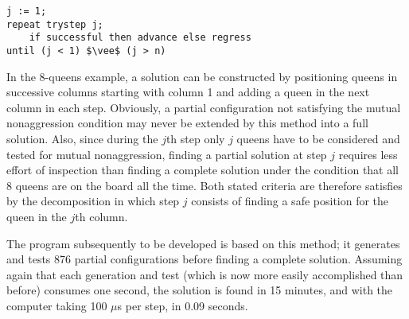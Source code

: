 \begin{lstlisting}
j := 1;
repeat trystep j;
    if successful then advance else regress
until (j < 1) $\vee$ (j > n)
\end{lstlisting}

In the 8-queens example, a solution can be constructed by positioning queens in
successive columns starting with column 1 and adding a queen in the next column
in each step.  Obviously, a partial configuration not satisfying the mutual
nonaggression condition may never be extended by this method into a full
solution.  Also, since during the $j$th step only $j$ queens have to be
considered and tested for mutual nonaggression, finding a partial solution at
step $j$ requires less effort of inspection than finding a complete solution
under the condition that all 8 queens are on the board all the time.  Both
stated criteria are therefore satisfies by the decomposition in which step $j$
consists of finding a safe position for the queen in the $j$th column.

The program subsequently to be developed is based on this method; it generates
and tests 876 partial configurations before finding a complete solution.
Assuming again that each generation and test (which is now more easily
accomplished than before) consumes one second, the solution is found in 15
minutes, and with the computer taking 100 $\mu$s per step, in 0.09 seconds.
